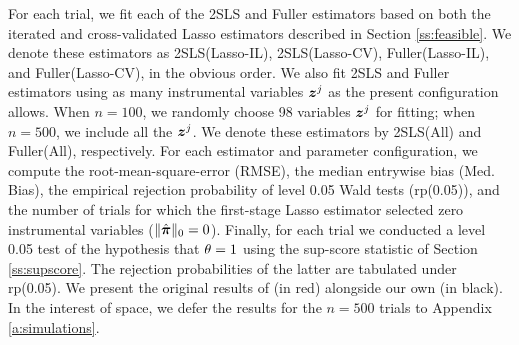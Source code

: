 \documentclass{uwstat572}
\renewcommand{\baselinestretch}{1.5}
\theoremstyle{definition}
\theoremstyle{remark}
\numberwithin{equation}{section}
\begin{document}
For each trial, we fit each of the 2SLS and Fuller estimators based on both the iterated and cross-validated Lasso estimators described in Section \ref{ss:feasible}. We denote these estimators as 2SLS(Lasso-IL), 2SLS(Lasso-CV), Fuller(Lasso-IL), and Fuller(Lasso-CV), in the obvious order. We also fit 2SLS and Fuller estimators using as many instrumental variables $\boldsymbol{z}^j$ as the present configuration allows. When $n=100$, we randomly choose 98 variables $\boldsymbol{z}^j$ for fitting; when $n=500$, we include all the $\boldsymbol{z}^j$. We denote these estimators by 2SLS(All) and Fuller(All), respectively. For each estimator and parameter configuration, we compute the root-mean-square-error (RMSE), the median entrywise bias (Med. Bias), the empirical rejection probability of level 0.05 Wald tests (rp(0.05)), and the number of trials for which the first-stage Lasso estimator selected zero instrumental variables ($\|\hat{\boldsymbol{\pi}}\|_0 = 0$). Finally, for each trial we conducted a level 0.05 test of the hypothesis that $\theta = 1$ using the sup-score statistic of Section \ref{ss:supscore}. The rejection probabilities of the latter are tabulated under rp(0.05). We present the original results of \cite{BCH11} (in red) alongside our own (in black). In the interest of space, we defer the results for the $n=500$ trials to Appendix \ref{a:simulations}.


\renewcommand{\baselinestretch}{1} 

\newcommand{\sr}{\rule[-0.45cm]{0pt}{0.9cm}}
\end{document}
